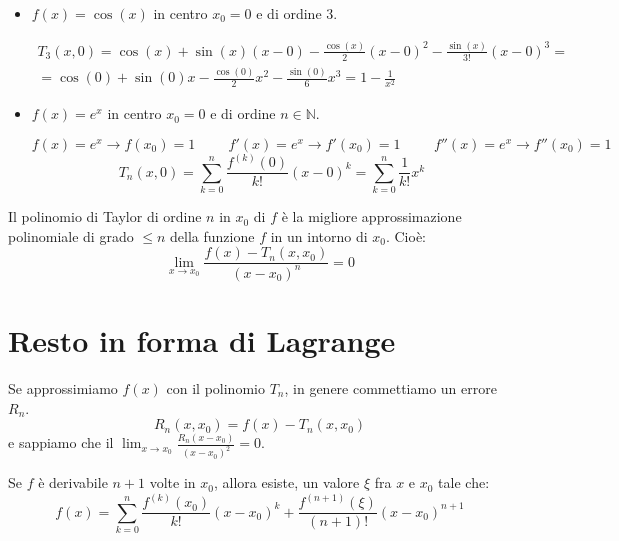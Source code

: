 \begin{example}
    \begin{itemize}
        \item $f(x)=\cos(x)$ in centro $x_0=0$ e di ordine 3.
        
        \begin{align*}
            T_3(x,0)=\cos(x)+\sin(x)(x-0)-\frac{\cos(x)}{2}(x-0)^2-\frac{\sin(x)}{3!}(x-0)^3=\\
            =\cos(0)+\sin(0)x-\frac{\cos(0)}{2}x^2-\frac{\sin(0)}{6}x^3=1-\frac{1}{x^2}
        \end{align*}
        
        \item $f(x)=e^x$ in centro $x_0=0$ e di ordine $n\in\mathbb{N}$.
        
        \begin{equation*}
            f(x)=e^x\to f(x_0)=1\hspace{1cm}f'(x)=e^x\to f'(x_0)=1\hspace{1cm}f''(x)=e^x\to f''(x_0)=1
        \end{equation*}
        \begin{equation*}
            T_n(x,0)=\sum^n_{k=0}\frac{f^{(k)}(0)}{k!}(x-0)^k=\sum^n_{k=0}\frac{1}{k!}x^k
        \end{equation*}
    \end{itemize}
\end{example}

Il polinomio di Taylor di ordine $n$ in $x_0$ di $f$ è la migliore approssimazione polinomiale di grado $\leq n$ della funzione $f$ in un intorno di $x_0$. Cioè:
\begin{equation*}
    \lim_{x\to x_0}\frac{f(x)-T_n(x,x_0)}{(x-x_0)^n}=0
\end{equation*}

\section{Resto in forma di Lagrange}
Se approssimiamo $f(x)$ con il polinomio $T_n$, in genere commettiamo un errore $R_n$.
\begin{equation*}
    R_n(x,x_0)=f(x)-T_n(x,x_0)
\end{equation*}
e sappiamo che il $\lim_{x\to x_0}\frac{R_n(x-x_0)}{(x-x_0)^2}=0$.

\begin{thm}
    Se $f$ è derivabile $n+1$ volte in $x_0$, allora esiste, un valore $\xi$ fra $x$ e $x_0$ tale che:
    \begin{equation*}
        f(x)=\sum^n_{k=0}\frac{f^{(k)}(x_0)}{k!}(x-x_0)^k+\frac{f^{(n+1)}(\xi)}{(n+1)!}(x-x_0)^{n+1}
    \end{equation*}
\end{thm}

